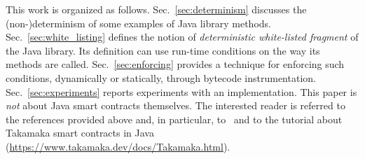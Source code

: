This work is organized as follows.
Sec.~\ref{sec:determinism} discusses the (non-)determinism of some
examples of Java library methods.
Sec.~\ref{sec:white_listing} defines the notion of \emph{deterministic white-listed fragment} of the Java library.
Its definition can use run-time conditions on the way its methods are called.
Sec.~\ref{sec:enforcing} provides a technique for enforcing such conditions, dynamically
or statically, through bytecode instrumentation.
Sec.~\ref{sec:experiments} reports experiments with an implementation.
%
This paper is \emph{not} about Java smart contracts themselves. The interested reader
is referred to the references provided above and, in particular, to~\cite{Spoto19}
and to the tutorial about Takamaka smart contracts in
Java (\url{https://www.takamaka.dev/docs/Takamaka.html}).
